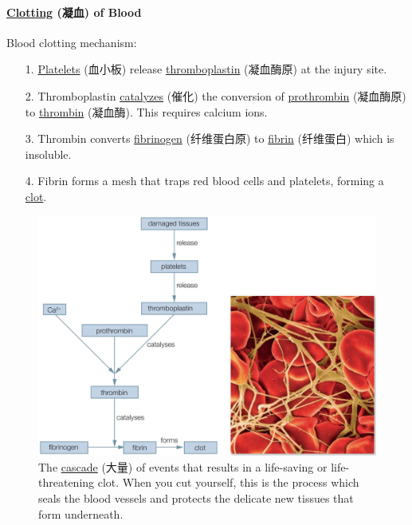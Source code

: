 \paragraph{\underline{Clotting} (凝血) of Blood} Blood clotting mechanism:
\begin{itemize}
    \item[1.] \underline{Platelets} (血小板) release \underline{thromboplastin} (凝血酶原) at the injury site.
    \item[2.] Thromboplastin \underline{catalyzes} (催化) the conversion of \underline{prothrombin} (凝血酶原) to
    \underline{thrombin} (凝血酶). This requires calcium ions.
    \item[3.] Thrombin converts \underline{fibrinogen} (纤维蛋白原) to \underline{fibrin} (纤维蛋白) which is insoluble.
    \item[4.] Fibrin forms a mesh that traps red blood cells and platelets, forming a \underline{clot}.
\end{itemize}
\begin{figure}[H]
    \centering
    \includegraphics[scale=0.25]{Biology/1B/Images/1B-2-6.png}
    \caption{The \underline{cascade} (大量) of events that results in a life-saving or life-threatening clot. When you cut
    yourself, this is the process which seals the blood vessels and protects the delicate new tissues that form underneath.}
\end{figure}
